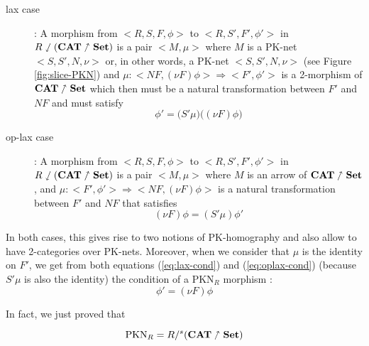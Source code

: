 \begin{description}
    \item[lax case] : A morphism from $\big<R,S,F,\phi\big>$ to  $\big<R,S',F',\phi'\big>$ in $R\sswarrow(\bf CAT\nnearrow Set)$ is a pair $\big<M,\mu\big>$ where
          $M$ is a PK-net $\big<S,S',N,\nu\big>$  or, in other words, a PK-net $\big<S,S',N,\nu\big>$ (see Figure \ref{fig:slice-PKN}) and
          $\mu : \big<NF,(\nu F)\phi\big> \Rightarrow \big<F',\phi'\big>$ is a 2-morphism of  $\textbf{CAT}\nnearrow\bf Set$ which then must be a natural transformation between $F'$ and $NF$ and must satisfy
          \begin{equation}
              \label{eq:lax-cond}
              \phi' = \big(S'\mu\big)\big((\nu F)\phi\big)
          \end{equation}
    \item[op-lax case] : A morphism from $\big<R,S,F,\phi\big>$ to  $\big<R,S',F',\phi'\big>$ in $R\sswarrow(\bf CAT\nnearrow Set)$ is a pair $\big<M,\mu\big>$ where
          $M$ is an arrow  of $\textbf{CAT}\nnearrow\bf Set$, and
          $\mu : \big<F',\phi'\big>\Rightarrow \big<NF,(\nu F)\phi\big>$ is a natural transformation between $F'$ and $NF$ that satisfies
          \begin{equation}
              \label{eq:oplax-cond}
              (\nu F)\phi = (S'\mu)\phi'
          \end{equation}
\end{description}

In both cases, this gives rise to two notions of PK-homography and also allow to have 2-categories over PK-nets. Moreover, when we consider that $\mu$ is the identity on $F'$, we get from both equations (\ref{eq:lax-cond}) and (\ref{eq:oplax-cond}) (because $S'\mu$ is also the identity) the condition of a $\text{PKN}_R$ morphism :
$$\phi' = (\nu F)\phi$$

In fact, we just proved that
\begin{thm}
    $$\text{PKN}_R = R /^s (\bf CAT\nnearrow Set)$$
\end{thm}


